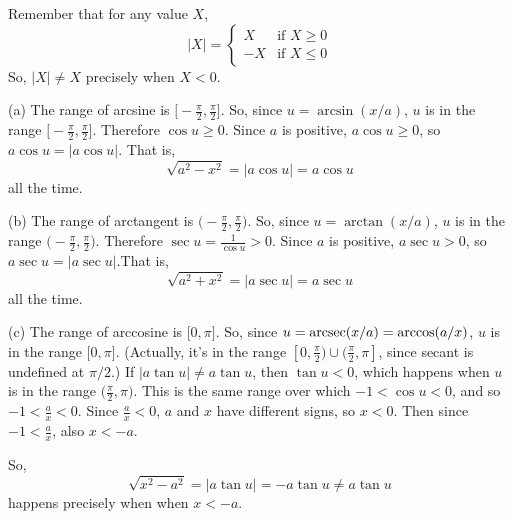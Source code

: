 \begin{solution}
Remember that for any value $X$, 
\[|X| = \left\{\begin{array}{rl}
X&\mbox{if }X \ge 0\\
-X&\mbox{if }X \le 0
\end{array}\right.\]
So, $|X| \neq X$ precisely when $X<0$.

(a) The range of arcsine is $\big[-\frac{\pi}{2},\frac{\pi}{2}\big]$. So, since $u=\arcsin(x/a)$, $u$ is in the range $\big[-\frac{\pi}{2},\frac{\pi}{2}\big]$. Therefore $\cos u \geq 0$. Since $a$ is positive, $a\cos u \ge 0$, so $a\cos u = |a\cos u|$. That is,
\[\sqrt{a^2-x^2}=|a\cos u|=a\cos u\]
all the time.

(b) The range of arctangent is $\big(-\frac{\pi}{2},\frac{\pi}{2}\big)$. So, since $u=\arctan(x/a)$, $u$ is in the range $\big(-\frac{\pi}{2},\frac{\pi}{2}\big)$. Therefore $\sec u = \frac{1}{\cos u} >0 $. Since $a$ is positive, $a\sec u > 0$, so $a\sec u = |a\sec u|$.That is,
\[\sqrt{a^2+x^2}=|a\sec u|=a\sec u\]
all the time.

(c) The range of arccosine is $\big[0,\pi \big]$. So, since $u=\mathop{\mathrm{arcsec}}(x/a) = \arccos(a/x)$, $u$ is in the range $\big[0,\pi\big]$. (Actually, it's in the range $[0,\frac{\pi}{2}) \cup (\frac{\pi}{2},\pi]$, since secant is undefined at $\pi/2$.) If $|a\tan u| \neq a\tan u$, then $\tan u <0$, which happens when $u$ is in the range $\big (\frac{\pi}{2},\pi)$. This is the same range over which $-1<\cos u <0$, and so $-1<\frac{a}{x}<0$. 
Since $\frac{a}{x}<0$, $a$ and $x$ have different signs, so $x<0$.  Then since $-1<\frac{a}{x}$, also $x<-a$.

So,
\[\sqrt{x^2-a^2} = |a\tan u| = -a\tan u \neq a\tan u\]
happens precisely when  when $x< -a$. 
\end{solution}
